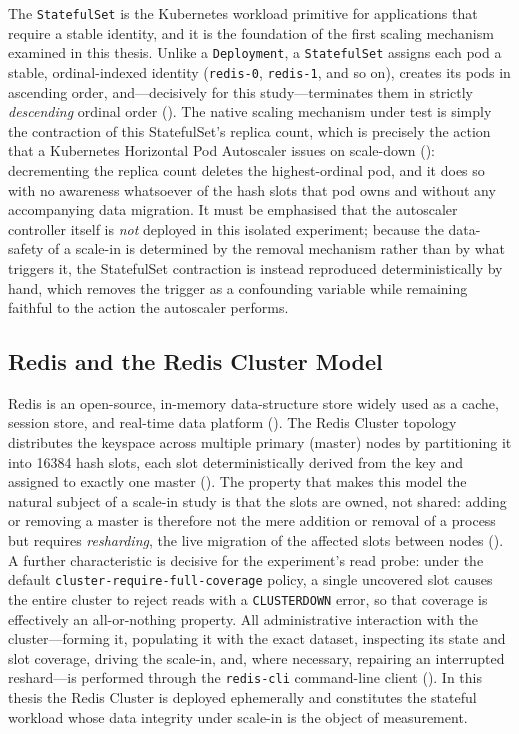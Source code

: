 The \texttt{StatefulSet} is the Kubernetes workload primitive for applications that require a
stable identity, and it is the foundation of the first scaling mechanism examined in this
thesis. Unlike a \texttt{Deployment}, a \texttt{StatefulSet} assigns each pod a stable,
ordinal-indexed identity (\texttt{redis-0}, \texttt{redis-1}, and so on), creates its pods in
ascending order, and---decisively for this study---terminates them in strictly
\textit{descending} ordinal order (\cite{kubernetes:statefulsets}). The native scaling
mechanism under test is simply the contraction of this StatefulSet's replica count, which is
precisely the action that a Kubernetes Horizontal Pod Autoscaler issues on scale-down
(\cite{kubernetes:autoscaling}): decrementing the replica count deletes the highest-ordinal
pod, and it does so with no awareness whatsoever of the hash slots that pod owns and without
any accompanying data migration. It must be emphasised that the autoscaler controller itself
is \textit{not} deployed in this isolated experiment; because the data-safety of a scale-in
is determined by the removal mechanism rather than by what triggers it, the StatefulSet
contraction is instead reproduced deterministically by hand, which removes the trigger as a
confounding variable while remaining faithful to the action the autoscaler performs.

\subsection{Redis and the Redis Cluster Model}
\label{subsec:redis}

Redis is an open-source, in-memory data-structure store widely used as a cache, session
store, and real-time data platform (\cite{redis:io}). The Redis Cluster topology distributes
the keyspace across multiple primary (master) nodes by partitioning it into \num{16384} hash
slots, each slot deterministically derived from the key and assigned to exactly one master
(\cite{redis:clusterspec}). The property that makes this model the natural subject of a
scale-in study is that the slots are owned, not shared: adding or removing a master is
therefore not the mere addition or removal of a process but requires \textit{resharding}, the
live migration of the affected slots between nodes (\cite{redis:scaling}). A further
characteristic is decisive for the experiment's read probe: under the default
\texttt{cluster-require-full-coverage} policy, a single uncovered slot causes the entire
cluster to reject reads with a \texttt{CLUSTERDOWN} error, so that coverage is effectively
an all-or-nothing property. All administrative interaction with the cluster---forming it,
populating it with the exact dataset, inspecting its state and slot coverage, driving the
scale-in, and, where necessary, repairing an interrupted reshard---is performed through the
\texttt{redis-cli} command-line client (\cite{redis_admin}). In this thesis the Redis Cluster
is deployed ephemerally and constitutes the stateful workload whose data integrity under
scale-in is the object of measurement.

